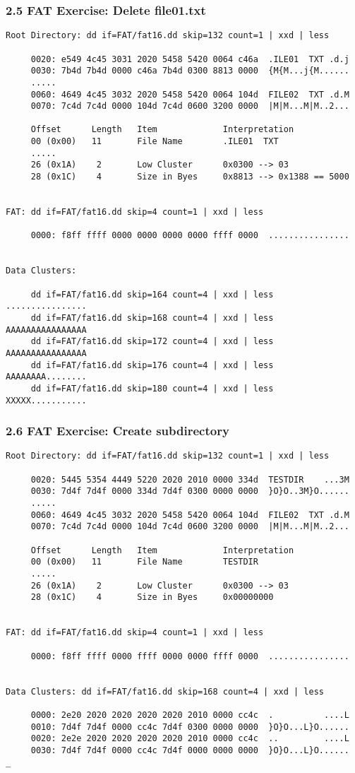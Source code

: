 \begin{frame}[fragile]
  \frametitle{2.5 FAT Exercise: Delete file01.txt}
  \begin{lstlisting}[basicstyle=\tiny]
Root Directory: dd if=FAT/fat16.dd skip=132 count=1 | xxd | less

     0020: e549 4c45 3031 2020 5458 5420 0064 c46a  .ILE01  TXT .d.j
     0030: 7b4d 7b4d 0000 c46a 7b4d 0300 8813 0000  {M{M...j{M......
     .....
     0060: 4649 4c45 3032 2020 5458 5420 0064 104d  FILE02  TXT .d.M
     0070: 7c4d 7c4d 0000 104d 7c4d 0600 3200 0000  |M|M...M|M..2...
  
     Offset      Length   Item             Interpretation
     00 (0x00)   11       File Name        .ILE01  TXT
     .....
     26 (0x1A)    2       Low Cluster      0x0300 --> 03
     28 (0x1C)    4       Size in Byes     0x8813 --> 0x1388 == 5000


FAT: dd if=FAT/fat16.dd skip=4 count=1 | xxd | less

     0000: f8ff ffff 0000 0000 0000 0000 ffff 0000  ................


Data Clusters:

     dd if=FAT/fat16.dd skip=164 count=4 | xxd | less    ................
     dd if=FAT/fat16.dd skip=168 count=4 | xxd | less    AAAAAAAAAAAAAAAA
     dd if=FAT/fat16.dd skip=172 count=4 | xxd | less    AAAAAAAAAAAAAAAA
     dd if=FAT/fat16.dd skip=176 count=4 | xxd | less    AAAAAAAA........
     dd if=FAT/fat16.dd skip=180 count=4 | xxd | less    XXXXX...........
\end{lstlisting}
\end{frame}


\begin{frame}[fragile]
  \frametitle{2.6 FAT Exercise: Create subdirectory}
  \begin{lstlisting}[basicstyle=\tiny]
Root Directory: dd if=FAT/fat16.dd skip=132 count=1 | xxd | less

     0020: 5445 5354 4449 5220 2020 2010 0000 334d  TESTDIR    ...3M
     0030: 7d4f 7d4f 0000 334d 7d4f 0300 0000 0000  }O}O..3M}O......
     .....
     0060: 4649 4c45 3032 2020 5458 5420 0064 104d  FILE02  TXT .d.M
     0070: 7c4d 7c4d 0000 104d 7c4d 0600 3200 0000  |M|M...M|M..2...
  
     Offset      Length   Item             Interpretation
     00 (0x00)   11       File Name        TESTDIR   
     .....
     26 (0x1A)    2       Low Cluster      0x0300 --> 03
     28 (0x1C)    4       Size in Byes     0x00000000


FAT: dd if=FAT/fat16.dd skip=4 count=1 | xxd | less

     0000: f8ff ffff 0000 ffff 0000 0000 ffff 0000  ................

  
Data Clusters: dd if=FAT/fat16.dd skip=168 count=4 | xxd | less

     0000: 2e20 2020 2020 2020 2020 2010 0000 cc4c  .          ....L
     0010: 7d4f 7d4f 0000 cc4c 7d4f 0300 0000 0000  }O}O...L}O......
     0020: 2e2e 2020 2020 2020 2020 2010 0000 cc4c  ..         ....L
     0030: 7d4f 7d4f 0000 cc4c 7d4f 0000 0000 0000  }O}O...L}O......
_
  \end{lstlisting}
\end{frame}



